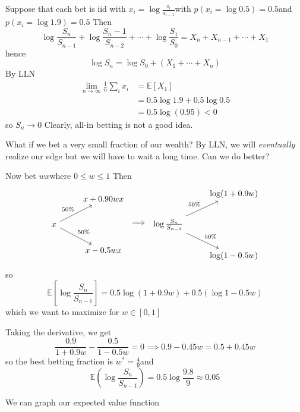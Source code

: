 \documentclass[12pt]{article}
\newcommand{\E}{\mathbb{E}}
\begin{document}
    Suppose that each bet is iid with $x_i = \log \frac{s_i}{s_{i-1}}$with $p(x_i = \log 0.5) = 0.5$and $p(x_i = \log 1.9) = 0.5$ Then 
    \[\log \frac{S_n}{S_{n-1}} + \log \frac{S_n-1}{S_{n-2}} + \cdots + \log \frac{S_1}{S_{0}} = X_n + X_{n-1} + \cdots + X_1\]
    hence 
    \[\log S_n = \log S_0 + (X_1 + \cdots + X_n)\] 
    By LLN 
    \begin{align*}
        \lim_{n \to \infty} \frac{1}{n} \sum_i x_i &= \E[X_1]\\ 
        &= 0.5 \log 1.9 + 0.5 \log 0.5\\
        &= 0.5 \log(0.95) < 0 
    \end{align*}
    so $S_n \to 0$ Clearly, all-in betting is not a good idea. 

    What if we bet a very small fraction of our wealth? By LLN, we will \emph{eventually} realize our edge but we will have to wait a long time. Can we do better?

    Now bet $wx$where $0 \leq w \leq 1$ Then 
    \[\begin{tikzcd}
        & x + 0.90wx\\ 
        x \arrow["50\%"]{ur} \arrow["50\%"]{dr} &\\
        & x - 0.5wx
    \end{tikzcd} \implies \begin{tikzcd}
        & \log(1 + 0.9w)\\
        \log \frac{S_n}{S_{n-1}} \arrow["50\%"]{ur} \arrow["50\%"]{dr} &\\
        & \log(1 - 0.5w)
    \end{tikzcd}\]
    so 
    \[\E[\log \frac{S_n}{S_{n-1}}] = 0.5 \log(1 + 0.9w) + 0.5(\log 1 - 0.5w)\] 
    which we want to maximize for $w \in [0, 1]$

    Taking the derivative, we get 
    \[\frac{0.9}{1  +0.9w} - \frac{0.5}{1 - 0.5w} = 0 \implies 0.9 - 0.45w = 0.5 + 0.45w\]
    so the best betting fraction is $w^* = \frac{4}{9}$and 
    \[\E(\log \frac{S_n}{S_{n-1}}) = 0.5\log \frac{9.8}{9} \approx 0.05\]

    We can graph our expected value function 

    \begin{center}
    \end{center}
\end{document}
